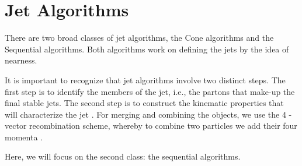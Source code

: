     

\section{Jet Algorithms}

There are two broad classes of jet algorithms, the Cone algorithms and the Sequential algorithms. Both algorithms work on defining the jets by the idea of nearness.

It is important to recognize that jet algorithms involve two distinct steps. The first step is to identify the members of the jet, i.e., the partons that make-up the final stable jets. The second step is to construct the kinematic properties that will characterize the jet \citep{Berger:2002jt}. For merging and combining the objects, we use the 4 -vector recombination scheme, whereby to combine two particles we add their four momenta \citep{Blazey:2000qt}. 

Here, we will focus on the second class:
the sequential algorithms.  

%
%

